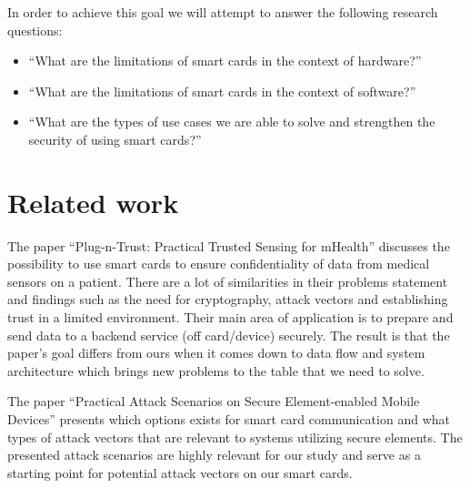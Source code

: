 In order to achieve this goal we will attempt to answer the following research questions:
\begin{itemize}
  \item ``What are the limitations of smart cards in the context of hardware?''
  \item ``What are the limitations of smart cards in the context of software?''
  \item ``What are the types of use cases we are able to solve and strengthen the security of using smart cards?''
\end{itemize}



\section{Related work}
The paper ``Plug-n-Trust: Practical Trusted Sensing for mHealth'' \cite{plugntrust} discusses the possibility to use smart cards to ensure confidentiality of data from medical sensors on a patient. There are a lot of similarities in their problems statement and findings such as the need for cryptography, attack vectors and establishing trust in a limited environment. Their main area of application is to prepare and send data to a backend service (off card/device) securely. The result is that the paper's goal differs from ours when it comes down to data flow and system architecture which brings new problems to the table that we need to solve.

The paper ``Practical Attack Scenarios on Secure Element-enabled Mobile Devices'' \cite{practicalAttacksSE} presents which options exists for smart card communication and what types of attack vectors that are relevant to systems utilizing secure elements. The presented attack scenarios are highly relevant for our study and serve as a starting point for potential attack vectors on our smart cards. 

